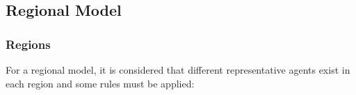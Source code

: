 \documentclass[
	thesis.tex
	]{subfiles}
\begin{document}

\subsection{Regional Model}\label{sec:regional-model}

%

\subsubsection*{Regions}\label{sec:regions}

For a regional model, it is considered that different representative agents exist in each region and some rules must be applied:
\end{document}
